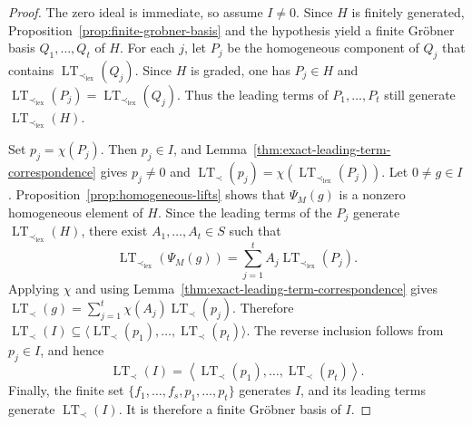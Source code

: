 \documentclass[10pt,a4paper]{amsart}
\newcommand{\LT}{\operatorname{LT}}
\begin{document}
	\begin{proof}
		The zero ideal is immediate, so assume $I\neq0$. Since $H$ is
		finitely generated, Proposition~\ref{prop:finite-grobner-basis}
		and the hypothesis yield a finite Gr\"obner basis
		$Q_1,\ldots,Q_t$ of $H$. For each $j$, let $P_j$ be
		the homogeneous component of $Q_j$ that contains
		$\LT_{\prec_{\mathrm{lex}}}(Q_j)$. Since $H$ is graded, one has
		$P_j\in H$ and
		$\LT_{\prec_{\mathrm{lex}}}(P_j)=
		\LT_{\prec_{\mathrm{lex}}}(Q_j)$. Thus the leading terms of
		$P_1,\ldots,P_t$ still generate
		$\LT_{\prec_{\mathrm{lex}}}(H)$.
		
		Set $p_j=\chi(P_j)$. Then $p_j\in I$, and
		Lemma~\ref{thm:exact-leading-term-correspondence} gives
		$p_j\neq0$ and
		$\LT_\prec(p_j)=
		\chi(\LT_{\prec_{\mathrm{lex}}}(P_j))$. Let $0\neq g\in I$. Proposition~\ref{prop:homogeneous-lifts} shows
		that $\Psi_M(g)$ is a nonzero homogeneous element of $H$. Since the
		leading terms of the $P_j$ generate
		$\LT_{\prec_{\mathrm{lex}}}(H)$, there exist
		$A_1,\ldots,A_t\in S$ such that
		\[
		\LT_{\prec_{\mathrm{lex}}}(\Psi_M(g))
		=
		\sum_{j=1}^t A_j\LT_{\prec_{\mathrm{lex}}}(P_j).
		\]
		Applying $\chi$ and using
		Lemma~\ref{thm:exact-leading-term-correspondence} gives
		$\LT_\prec(g)=\sum_{j=1}^t\chi(A_j)\LT_\prec(p_j)$.
		Therefore $\LT_\prec(I)\subseteq
		\langle\LT_\prec(p_1),\ldots,\LT_\prec(p_t)\rangle$. The reverse
		inclusion follows from $p_j\in I$, and hence
		\begin{equation}
			\label{eq:leading-term-ideal-descent}
			\LT_\prec(I)
			=
			\left\langle\LT_\prec(p_1),\ldots,\LT_\prec(p_t)\right\rangle.
		\end{equation}
		Finally, the finite set
		$\{f_1,\ldots,f_s,p_1,\ldots,p_t\}$ generates $I$, and its leading
		terms generate $\LT_\prec(I)$. It is therefore a finite Gr\"obner
		basis of $I$.
	\end{proof}
\end{document}
